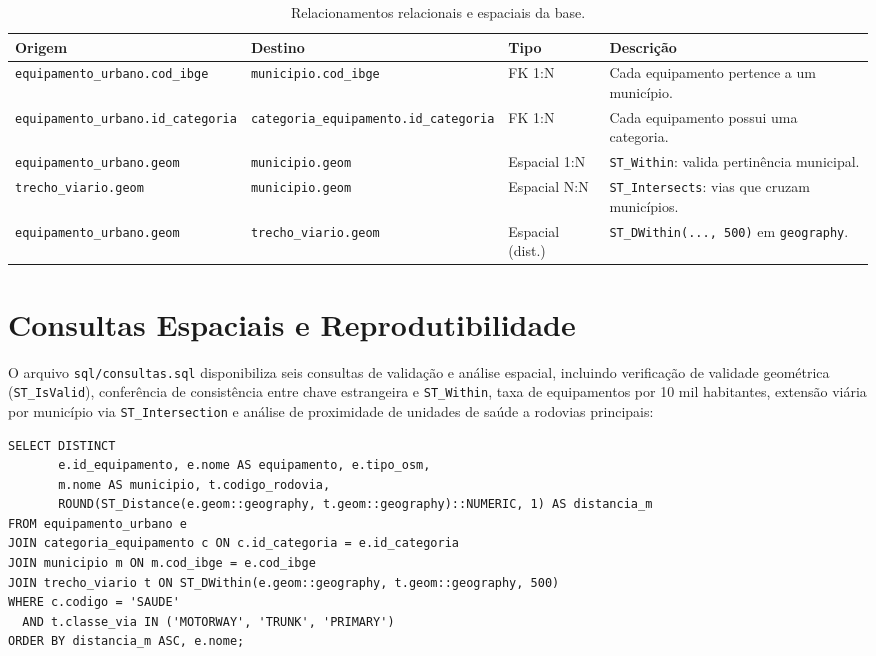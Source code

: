 \documentclass[
    12pt,
    oneside,
    a4paper,
    chapter=TITLE,
    section=TITLE,
    brazil
]{abntex2}
\begin{document}
\begin{table}[H]
\centering
\caption{Relacionamentos relacionais e espaciais da base.}
\label{tab:relacionamentos}
\scriptsize
\begin{tabularx}{\textwidth}{p{4.2cm} p{4.0cm} p{1.9cm} X}
\toprule
\textbf{Origem} & \textbf{Destino} & \textbf{Tipo} & \textbf{Descrição} \\
\midrule
\texttt{equipamento\_urbano.\allowbreak cod\_ibge} & \texttt{municipio.\allowbreak cod\_ibge} & FK 1:N & Cada equipamento pertence a um município. \\
\texttt{equipamento\_urbano.\allowbreak id\_categoria} & \texttt{categoria\_equipamento.\allowbreak id\_categoria} & FK 1:N & Cada equipamento possui uma categoria. \\
\texttt{equipamento\_urbano.\allowbreak geom} & \texttt{municipio.\allowbreak geom} & Espacial 1:N & \texttt{ST\_Within}: valida pertinência municipal. \\
\texttt{trecho\_viario.\allowbreak geom} & \texttt{municipio.\allowbreak geom} & Espacial N:N & \texttt{ST\_Intersects}: vias que cruzam municípios. \\
\texttt{equipamento\_urbano.\allowbreak geom} & \texttt{trecho\_viario.\allowbreak geom} & Espacial (dist.) & \texttt{ST\_DWithin(..., 500)} em \texttt{geography}. \\
\bottomrule
\end{tabularx}
\end{table}

\chapter{Consultas Espaciais e Reprodutibilidade}

O arquivo \texttt{sql/consultas.sql} disponibiliza seis consultas de validação e análise espacial, incluindo verificação de validade geométrica (\texttt{ST\_IsValid}), conferência de consistência entre chave estrangeira e \texttt{ST\_Within}, taxa de equipamentos por 10 mil habitantes, extensão viária por município via \texttt{ST\_Intersection} e análise de proximidade de unidades de saúde a rodovias principais:

\begin{lstlisting}[caption={Exemplo de consulta espacial de proximidade em PostGIS (\texttt{sql/consultas.sql}).}]
SELECT DISTINCT
       e.id_equipamento, e.nome AS equipamento, e.tipo_osm,
       m.nome AS municipio, t.codigo_rodovia,
       ROUND(ST_Distance(e.geom::geography, t.geom::geography)::NUMERIC, 1) AS distancia_m
FROM equipamento_urbano e
JOIN categoria_equipamento c ON c.id_categoria = e.id_categoria
JOIN municipio m ON m.cod_ibge = e.cod_ibge
JOIN trecho_viario t ON ST_DWithin(e.geom::geography, t.geom::geography, 500)
WHERE c.codigo = 'SAUDE'
  AND t.classe_via IN ('MOTORWAY', 'TRUNK', 'PRIMARY')
ORDER BY distancia_m ASC, e.nome;
\end{lstlisting}
\end{document}
